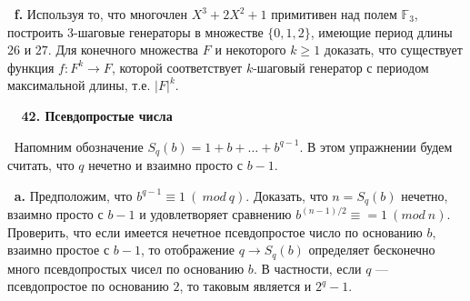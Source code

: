 \documentclass{mai_book}
\begin{document}
$\:$\newline \indent
\textbf{f.} Используя то, что многочлен $X^3 + 2X^2 + 1$ примитивен над полем
$\mathds{F}_3$, построить 3-шаговые генераторы в множестве $\{0,1,2\}$, имеющие
период длины $26$ и $27$. Для конечного множества $F$ и некоторого $k \geq 1$ доказать, что существует функция $f : F^k \rightarrow F$, которой соответствует
$k$-шаговый генератор с периодом максимальной длины, т.е. $|F|^k$.

$\:$\newline
$\:$\newline
\textbf{42. Псевдопростые числа}

$\:$\newline \indent
Напомним обозначение $S_q(b)=1+b+\dots+b^{q-1}$. В этом упражнении
будем считать, что $q$ нечетно и взаимно просто с $b - 1$.

$\:$\newline\indent
\textbf{a.} Предположим, что $b^{q - 1} \equiv 1\:(\:mod\:q)$. Доказать, что $n = S_q(b)$ нечетно, взаимно просто с $b -1$ и удовлетворяет сравнению $b^{(n- 1)/2} \equiv = 1\:(mod\:n)$. Проверить, что если имеется нечетное псевдопростое число по основанию $b,$ взаимно простое с $b - 1$, то отображение $q \rightarrow S_q(b)$ определяет бесконечно много псевдопростых чисел по основанию $b$. В частности, если $q$ — псевдопростое по основанию $2$, то таковым является и $2^q- 1$.
\end{document}
